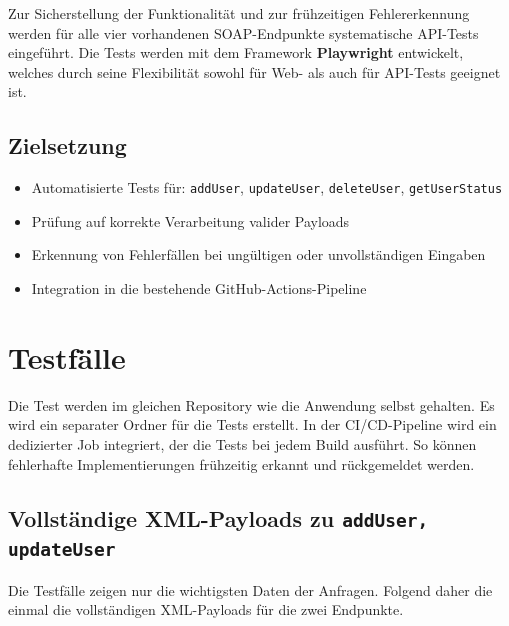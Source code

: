 Zur Sicherstellung der Funktionalität und zur frühzeitigen Fehlererkennung werden für alle vier vorhandenen SOAP-Endpunkte systematische API-Tests eingeführt. Die Tests werden mit dem Framework \textbf{Playwright} entwickelt, welches durch seine Flexibilität sowohl für Web- als auch für API-Tests geeignet ist.

\subsection*{Zielsetzung}
\begin{itemize}
    \item Automatisierte Tests für: \texttt{addUser}, \texttt{updateUser}, \texttt{deleteUser}, \texttt{getUserStatus}
    \item Prüfung auf korrekte Verarbeitung valider Payloads
    \item Erkennung von Fehlerfällen bei ungültigen oder unvollständigen Eingaben
    \item Integration in die bestehende GitHub-Actions-Pipeline
\end{itemize}

\section{Testfälle}

Die Test werden im gleichen Repository wie die Anwendung selbst gehalten. Es wird ein separater Ordner für die Tests erstellt. In der CI/CD-Pipeline wird ein dedizierter Job integriert, der die Tests bei jedem Build ausführt. So können fehlerhafte Implementierungen frühzeitig erkannt und rückgemeldet werden.

\subsection{Vollständige XML-Payloads zu \texttt{addUser, updateUser}}
Die Testfälle zeigen nur die wichtigsten Daten der Anfragen. Folgend daher die einmal die vollständigen XML-Payloads für die zwei Endpunkte.


